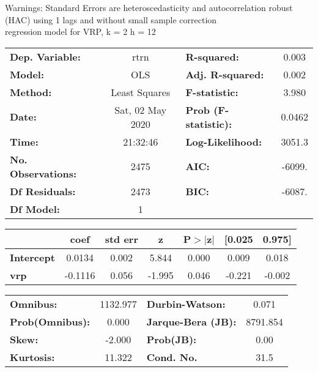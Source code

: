Warnings: \newline
 [1] Standard Errors are heteroscedasticity and autocorrelation robust (HAC) using 1 lags and without small sample correction\\ 

regression model for VRP, k = 2 h = 12\begin{center}
\begin{tabular}{lclc}
\toprule
\textbf{Dep. Variable:}    &       rtrn       & \textbf{  R-squared:         } &     0.003   \\
\textbf{Model:}            &       OLS        & \textbf{  Adj. R-squared:    } &     0.002   \\
\textbf{Method:}           &  Least Squares   & \textbf{  F-statistic:       } &     3.980   \\
\textbf{Date:}             & Sat, 02 May 2020 & \textbf{  Prob (F-statistic):} &   0.0462    \\
\textbf{Time:}             &     21:32:46     & \textbf{  Log-Likelihood:    } &    3051.3   \\
\textbf{No. Observations:} &        2475      & \textbf{  AIC:               } &    -6099.   \\
\textbf{Df Residuals:}     &        2473      & \textbf{  BIC:               } &    -6087.   \\
\textbf{Df Model:}         &           1      & \textbf{                     } &             \\
\bottomrule
\end{tabular}
\begin{tabular}{lcccccc}
                   & \textbf{coef} & \textbf{std err} & \textbf{z} & \textbf{P$> |$z$|$} & \textbf{[0.025} & \textbf{0.975]}  \\
\midrule
\textbf{Intercept} &       0.0134  &        0.002     &     5.844  &         0.000        &        0.009    &        0.018     \\
\textbf{vrp}       &      -0.1116  &        0.056     &    -1.995  &         0.046        &       -0.221    &       -0.002     \\
\bottomrule
\end{tabular}
\begin{tabular}{lclc}
\textbf{Omnibus:}       & 1132.977 & \textbf{  Durbin-Watson:     } &    0.071  \\
\textbf{Prob(Omnibus):} &   0.000  & \textbf{  Jarque-Bera (JB):  } & 8791.854  \\
\textbf{Skew:}          &  -2.000  & \textbf{  Prob(JB):          } &     0.00  \\
\textbf{Kurtosis:}      &  11.322  & \textbf{  Cond. No.          } &     31.5  \\
\bottomrule
\end{tabular}
\end{center}


